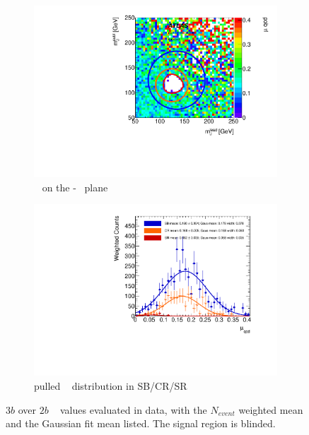 \begin{figure}[htb!]
\centering
\captionsetup{justification=centering}
	\hspace{-1cm}
    \begin{subfigure}[b]{0.4\textwidth}
        \includegraphics[width=\textwidth,angle=-90]{figures/boosted/AppendixMuqcdstudy/ThreeTag_Incl_mH0H1.pdf}
        \caption{\muqcd~ on the \mleadJ-\msublJ~ plane}
        \label{fig:app-muqcd-3b-2d}
    \end{subfigure}
    \quad \quad \quad \quad 
    \begin{subfigure}[b]{0.4\textwidth}
        \includegraphics[width=\textwidth,angle=-90]{figures/boosted/AppendixMuqcdstudy/ThreeTag_Incl_mH0H1_pull.pdf}
        \caption{pulled \muqcd~ distribution in SB/CR/SR}
        \label{fig:app-muqcd-3b-pull}
    \end{subfigure}
\caption{$3b$ over $2b$ \muqcd~ values evaluated in data, with the $N_{event}$ weighted mean and the Gaussian fit mean listed. The signal region is blinded.}
\label{fig:app-muqcd-3b}
\end{figure}

